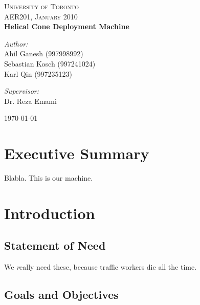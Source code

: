 \documentclass[11pt]{report}
\begin{document}
\begin{titlepage}
 \begin{center}

\textsc{\large University of Toronto}\\[1.5cm]
\textsc{\normalsize AER201, January 2010}\\[0.5cm]


{ \huge \bfseries Helical Cone Deployment Machine}\\[0.4cm]

\begin{minipage}{0.4\textwidth}
\begin{flushleft} \large
\emph{Author:}\\
Ahil Ganesh (997998992)\\
Sebastian Kosch (997241024)\\
Karl Qin (997235123)\\
\end{flushleft}
\end{minipage}
\begin{minipage}{0.4\textwidth}
\begin{flushright} \large
\emph{Supervisor:} \\
Dr. Reza Emami
\end{flushright}
\end{minipage}

\vfill

{\large \today}

\end{center}
\end{titlepage}

\chapter{Executive Summary}
Blabla. This is our machine.

\chapter{Introduction}

\section{Statement of Need}

We {\textit really} need these, because traffic workers die all the time.

\section{Goals and Objectives}
\end{document}
